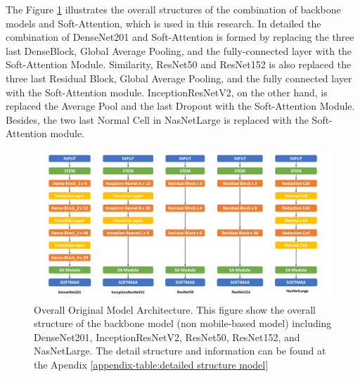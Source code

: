 \documentclass[sensors,article,submit,pdftex,moreauthors]{Definitions/mdpi}
\begin{document}
The Figure \ref{fig:model-structure} illustrates the overall structures of the combination of backbone models and Soft-Attention, which is used in this research. In detailed the combination of DenseNet201 and Soft-Attention is formed by replacing the three last DenseBlock, Global Average Pooling, and the fully-connected layer with the Soft-Attention Module. Similarity, ResNet50 and ResNet152 is also replaced the three last Residual Block, Global Average Pooling, and the fully connected layer with the Soft-Attention module. InceptionResNetV2, on the other hand, is replaced the Average Pool and the last Dropout with the Soft-Attention Module. Besides, the two last Normal Cell in NasNetLarge is replaced with the Soft-Attention module. 

\begin{figure}[H]
	\centering
	\includegraphics[width=1\linewidth]{Definitions/Model Structure}
	\caption{Overall Original Model Architecture. This figure show the overall structure of the backbone model (non mobile-based model) including DenseNet201, InceptionResNetV2, ResNet50, ResNet152, and NasNetLarge. The detail structure and information can be found at the Apendix \ref{appendix-table:detailed structure model}}
	\label{fig:model-structure}
\end{figure}
\end{document}
